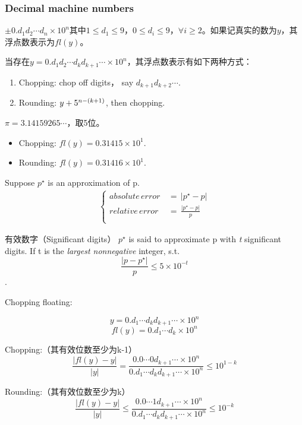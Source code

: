 \subsubsection{Decimal machine numbers}
$\pm 0.d_1d_2\cdots d_n \times 10^n$其中$1\leq d_1\leq 9$，$0\leq d_i\leq 9$，$\forall i\geq 2$。如果记真实的数为$y$，其浮点数表示为$fl(y)$。\par
当存在$y=0.d_1d_2\cdots d_kd_{k+1}\cdots\times 10^n$，其浮点数表示有如下两种方式：
\begin{enumerate}
    \item Chopping: chop off digits， say $d_{k+1}d_{k+2}\cdots$.
    \item Rounding: $y+5\time 10^{n-(k+1)}$, then chopping.
\end{enumerate}
\begin{example}
$\pi=3.14159265\cdots$，取5位。\par
    \begin{itemize}
      \item Chopping: $fl(y)=0.31415\times 10^1$.
      \item Rounding: $fl(y)=0.31416\times 10^1$.
    \end{itemize}
\end{example}\par
\begin{defn}{ }
Suppose $p^\star$ is an approximation of p.
\begin{align*}
    \begin{cases}
        absolute\,error\,&=\,\left|p^\star-p\right| \\
        relative\,error\,&=\,\frac{\left|p^\star-p\right|}{p} \\
    \end{cases}
\end{align*}
\end{defn}

\begin{defn}{有效数字（Significant digits）}
$p^\star$ is said to approximate p with \emph{t} significant digits. If t is the \emph{largest nonnegative} integer, s.t. $$\frac{\left|p-p^\star\right|}{p}\leq 5\times 10^{-t}$$.
\end{defn}\par
Chopping floating:\par
$$y=0.d_1\cdots d_kd_{k+1}\cdots\times 10^n$$
$$fl(y) = 0.d_1\cdots d_k\times 10^n$$\par
Chopping:（其有效位数至少为k-1）
$$
\frac{\left|fl(y)-y\right|}{\left|y\right|} = \frac{0.0\cdots 0d_{k+1}\cdots\times 10^n}{0.d_1\cdots d_kd_{k+1}\cdots\times 10^n} \leq 10^{1-k}
$$\par
Rounding:（其有效位数至少为k）
$$
\frac{\left|fl(y)-y\right|}{\left|y\right|} \leq \frac{0.0\cdots 1d_{k+1}\cdots\times 10^n}{0.d_1\cdots d_kd_{k+1}\cdots\times 10^n} \leq 10^{-k}
$$

